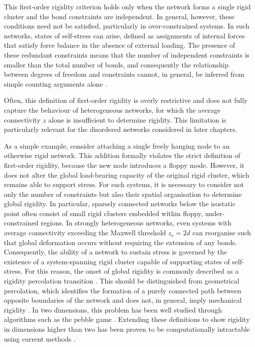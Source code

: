 This first-order rigidity criterion holds only when the network forms a single rigid cluster and the bond constraints are independent. In general, however, these conditions need not be satisfied, particularly in over-constrained systems. In such networks, states of self-stress can arise, defined as assignments of internal forces that satisfy force balance in the absence of external loading. The presence of these redundant constraints means that the number of independent constraints is smaller than the total number of bonds, and consequently the relationship between degrees of freedom and constraints cannot, in general, be inferred from simple counting arguments alone \cite{calladine_buckminster_1978}.

Often, this definition of first-order rigidity is overly restrictive and does not fully capture the behaviour of heterogeneous networks, for which the average connectivity $z$ alone is insufficient to determine rigidity. This limitation is particularly relevant for the disordered networks considered in later chapters.

As a simple example, consider attaching a single freely hanging node to an otherwise rigid network. This addition formally violates the strict definition of first-order rigidity, because the new node introduces a floppy mode. However, it does not alter the global load-bearing capacity of the original rigid cluster, which remains able to support stress. For such systems, it is necessary to consider not only the number of constraints but also their spatial organisation to determine global rigidity. In particular, sparsely connected networks below the isostatic point often consist of small rigid clusters embedded within floppy, under-constrained regions. In strongly heterogeneous networks, even systems with average connectivity exceeding the Maxwell threshold $z_c = 2d$ can reorganise such that global deformation occurs without requiring the extension of any bonds. Consequently, the ability of a network to sustain stress is governed by the existence of a system-spanning rigid cluster capable of supporting states of self-stress. For this reason, the onset of global rigidity is commonly described as a rigidity percolation transition \cite{zhang_correlated_2019}. This should be distinguished from geometrical percolation, which identifies the formation of a purely connected path between opposite boundaries of the network and does not, in general, imply mechanical rigidity \cite{kendall_percolation_2009,broadbent_percolation_1957}. In two dimensions, this problem has been well studied \cite{ellenbroek_rigidity_2015} through algorithms such as the pebble game \cite{jacobs_algorithm_1997, jacobs_generic_1995}. Extending these definitions to show rigidity in dimensions higher than two has been proven to be computationally intractable using current methods \cite{abbott_generalizations_2008}.

